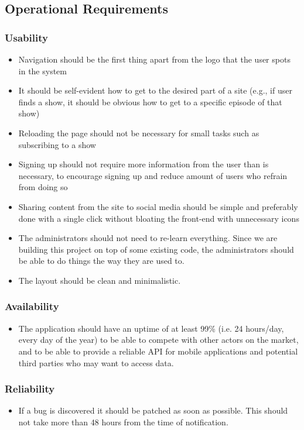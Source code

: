\subsection{Operational Requirements}

\subsubsection*{Usability}
\begin{itemize}
\item Navigation should be the first thing apart from the logo that the user spots in the system
\item It should be self-evident how to get to the desired part of a site (e.g., if user finds a show, it should be obvious how to get to a specific episode of that show)
\item Reloading the page should not be necessary for small tasks such as subscribing to a show
\item Signing up should not require more information from the user than is necessary, to encourage signing up and reduce amount of users who refrain from doing so
\item Sharing content from the site to social media should be simple and preferably done with a single click without bloating the front-end with unnecessary icons
\item The administrators should not need to re-learn everything. Since we are building this project on top of some existing code, the administrators should be able to do things the way they are used to.
\item The layout should be clean and minimalistic.
\end{itemize}

\subsubsection*{Availability}
\begin{itemize}
\item The application should have an uptime of at least 99\% (i.e. 24 hours/day, every day of the year) to be able to compete with other actors on the market, and to be able to provide a reliable API for mobile applications and potential third parties who may want to access data. 
\end{itemize}

\subsubsection*{Reliability}
\begin{itemize}
\item If a bug is discovered it should be patched as soon as possible. This should not take more than 48 hours from the time of notification.
\end{itemize}

